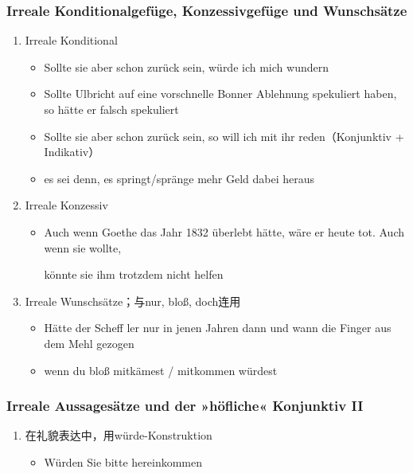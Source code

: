 \documentclass[UTF8]{report}
\begin{document}
\subsubsection{Irreale Konditionalgefüge, Konzessivgefüge und Wunschsätze}
\begin{enumerate}
    \item Irreale Konditional
    \begin{itemize}
        \item Sollte sie aber schon zurück sein, würde ich mich wundern
        \item Sollte Ulbricht auf eine vorschnelle Bonner Ablehnung spekuliert haben, so hätte er falsch spekuliert
        \item Sollte sie aber schon zurück sein, so will ich mit ihr reden（Konjunktiv + Indikativ）
        \item es sei denn, es springt/spränge mehr Geld dabei heraus 
    \end{itemize}
    \item Irreale Konzessiv
    \begin{itemize}
        \item Auch wenn Goethe das Jahr 1832 überlebt hätte, wäre er heute tot. Auch wenn sie wollte, 
        
        könnte sie ihm trotzdem nicht helfen
    \end{itemize}
    \item Irreale Wunschsätze；与nur, bloß, doch连用
    \begin{itemize}
        \item Hätte der Scheff ler nur in jenen Jahren dann und wann die Finger aus dem Mehl gezogen
        \item wenn du bloß mitkämest / mitkommen würdest
    \end{itemize}
\end{enumerate}

\subsubsection{Irreale Aussagesätze und der »höfliche« Konjunktiv II}
\begin{enumerate}
    \item 在礼貌表达中，用würde-Konstruktion
    \begin{itemize}
        \item Würden Sie bitte hereinkommen
    \end{itemize}
\end{enumerate}
\end{document}
